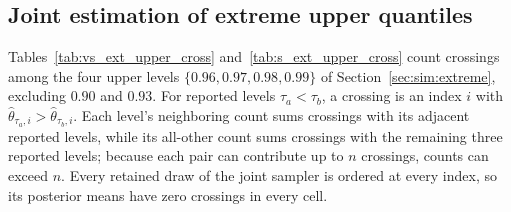 \subsection{Joint estimation of extreme upper quantiles}
\label{app:sim:joint_extreme}

Tables~\ref{tab:vs_ext_upper_cross} and~\ref{tab:s_ext_upper_cross} count crossings among the four upper levels $\{0.96, 0.97, 0.98, 0.99\}$ of Section~\ref{sec:sim:extreme}, excluding $0.90$ and $0.93$. For reported levels $\tau_a < \tau_b$, a crossing is an index $i$ with $\widehat{\theta}_{\tau_a,i} > \widehat{\theta}_{\tau_b,i}$. Each level's neighboring count sums crossings with its adjacent reported levels, while its all-other count sums crossings with the remaining three reported levels; because each pair can contribute up to $n$ crossings, counts can exceed $n$. Every retained draw of the joint sampler is ordered at every index, so its posterior means have zero crossings in every cell.

